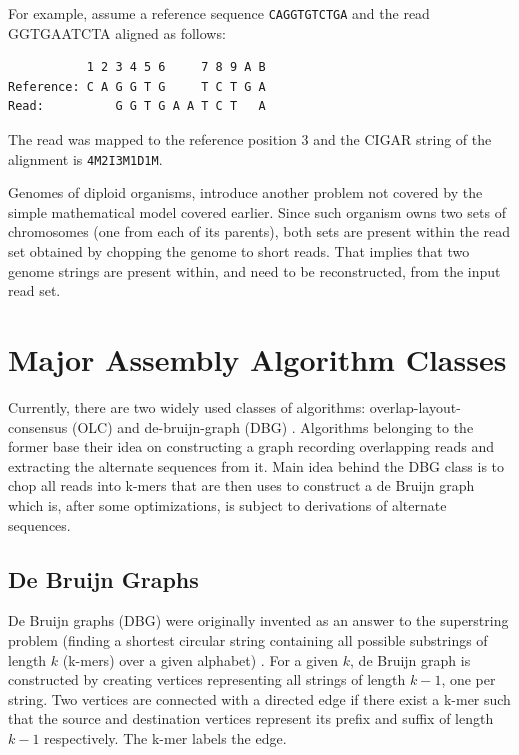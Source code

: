 For example, assume a reference sequence \texttt{CAGGTGTCTGA} and the read GGTGAATCTA aligned as follows:
\begin{verbatim}
           1 2 3 4 5 6     7 8 9 A B
Reference: C A G G T G     T C T G A
Read:          G G T G A A T C T   A
\end{verbatim}
The read was mapped to the reference position 3 and the CIGAR string of the alignment is \texttt{4M2I3M1D1M}.

Genomes of diploid organisms, introduce another problem not covered by the simple mathematical model covered earlier. Since such organism owns two sets of chromosomes (one from each of its parents), both sets are present within the read set obtained by chopping the genome to short reads. That implies that two genome strings are present within, and need to be reconstructed, from the input read set.

\section{Major Assembly Algorithm Classes}
\label{sec:major-assembly-algorithm-classes}

Currently, there are two widely used classes of algorithms: overlap-layout-consensus (OLC) and de-bruijn-graph (DBG) \cite{alg-compare}. Algorithms belonging to the former base their idea on constructing a graph recording overlapping reads and extracting the alternate sequences from it. Main idea behind the DBG class is to chop all reads into k-mers that are then uses to construct a de Bruijn graph which is, after some optimizations, is subject to derivations of alternate sequences.

\subsection{De Bruijn Graphs}
\label{subsec:de-bruijn-graphs}

De Bruijn graphs (DBG) were originally invented as an answer to the superstring problem  (finding a shortest circular string containing all possible substrings of length $k$ (k-mers) over a given alphabet) \cite{dbg-apply}. For a given $k$, de Bruijn graph is constructed by creating vertices representing all strings of length $k-1$, one per string. Two vertices are connected with a directed edge if there exist a k-mer such that the source and destination vertices represent its prefix and suffix of length $k-1$ respectively. The k-mer labels the edge. 

